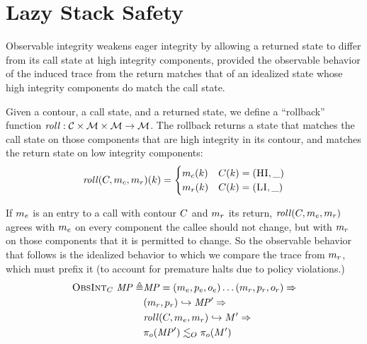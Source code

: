 \documentclass[acmsmall,review,anonymous]{acmart}\settopmatter{printfolios=true,printccs=false,printacmref=false}
\begin{document}

\section{Lazy Stack Safety}
\label{sec:lazy}

      Observable integrity weakens eager integrity by allowing a returned state
      to differ from its call state at high integrity components, provided the
      observable behavior of the induced trace from the return matches that of
      an idealized state whose high integrity components do match the call
      state.

      Given a contour, a call state, and a returned state, we define a
      ``rollback'' function \(\mathit{roll} : {\mathcal C} \times {\mathcal M} \times
      {\mathcal M} \rightarrow {\mathcal M}\). The rollback returns a state that matches
      the call state on those components that are high integrity in its
      contour, and matches the return state on low integrity components:
      \[\mathit{roll}(C,m_c,m_r)(k) =
      \begin{cases}
        m_c(k) & C(k) = (\textsc{HI},\_) \\
        m_r(k) & C(k) = (\textsc{LI},\_) \\
      \end{cases}\]

      If \(m_e\) is an entry to a call with contour \(C\) and
      \(m_r\) its return, \(\mathit{roll}(C,m_e,m_r)\)
      agrees with \(m_e\) on every component the callee should not change,
      but with \(m_r\) on those components that it is permitted to change.
      So the observable behavior that follows is the idealized behavior to
      which we compare the trace from \(m_r\), which must prefix it (to
      account for premature halts due to policy violations.)
      \[\begin{split}
        \text{\sc ObsInt}_C ~ \mathit{MP} \triangleq
          & \mathit{MP} = (m_e,p_e,o_e) \dots
            (m_r,p_r,o_r) \Rightarrow \\
        & (m_r,p_r) \hookrightarrow \mathit{MP}' \Rightarrow \\
        & \mathit{roll}(C,m_e,m_r) \hookrightarrow M' \Rightarrow \\
        & \pi_o(\mathit{MP}') \lesssim_O \pi_o(M')
      \end{split}\]
\end{document}
